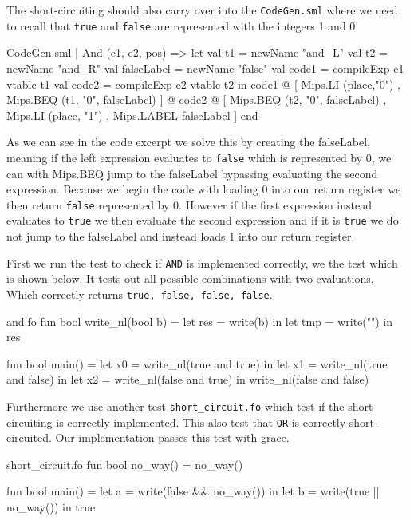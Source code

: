 \documentclass[11pt,a4paper,oneside]{report}
\begin{document}
The short-circuiting should also carry over into the \texttt{CodeGen.sml} where we need to recall that \texttt{true} and \texttt{false} are represented with the integers 1 and 0.
\begin{code}[firstnumber=413]{CodeGen.sml}
  | And (e1, e2, pos) =>
    let val t1 = newName "and_L"
        val t2 = newName "and_R"
        val falseLabel = newName "false"
        val code1 = compileExp e1 vtable t1
        val code2 = compileExp e2 vtable t2
    in
      code1 @
      [ Mips.LI (place,"0")
      , Mips.BEQ (t1, "0", falseLabel) ]
      @ code2 @
      [ Mips.BEQ (t2, "0", falseLabel)
      , Mips.LI (place, "1")
      , Mips.LABEL falseLabel ]
    end
\end{code}
As we can see in the code excerpt we solve this by creating the falseLabel, meaning if the left expression evaluates to \texttt{false} which is represented by 0, we can with Mips.BEQ jump to the falseLabel bypassing evaluating the second expression. Because we begin the code with loading 0 into our return register we then return \texttt{false} represented by 0. However if the first expression instead evaluates to \texttt{true} we then evaluate the second expression and if it is \texttt{true} we do not jump to the falseLabel and instead loads 1 into our return register.

First we run the test to check if \texttt{AND} is implemented correctly, we the test which is shown below. It tests out all possible combinations with two evaluations. Which correctly returns \texttt{true, false, false, false}.

\begin{code}{and.fo}
fun bool write_nl(bool b) =
  let res = write(b) in
  let tmp = write("\n") in
  res

fun bool main() =
    let x0 = write_nl(true and true) in
    let x1 = write_nl(true and false) in
    let x2 = write_nl(false and true) in
    write_nl(false and false)
\end{code}

Furthermore we use another test \texttt{short\_circuit.fo} which test if the short-circuiting is correctly implemented. This also test that \texttt{OR} is correctly short-circuited. Our implementation passes this test with grace.

\begin{code}{short\_circuit.fo}
fun bool no_way() = no_way()

fun bool main() =
  let a = write(false && no_way()) in
  let b = write(true || no_way()) in
  true
\end{code}
\end{document}
